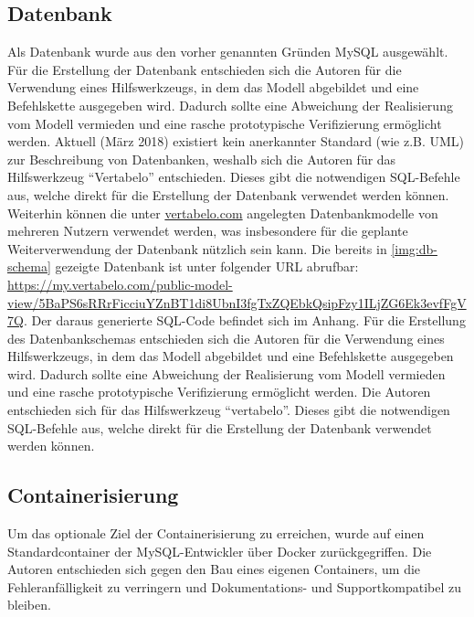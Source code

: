 \subsection{Datenbank}


Als Datenbank wurde aus den vorher genannten Gründen MySQL ausgewählt.
Für die Erstellung der Datenbank entschieden sich die Autoren für die Verwendung eines Hilfswerkzeugs, in dem das Modell abgebildet und eine Befehlskette ausgegeben wird. Dadurch sollte eine Abweichung der Realisierung vom Modell vermieden und eine rasche prototypische Verifizierung ermöglicht werden. Aktuell (März 2018) existiert kein anerkannter Standard (wie z.B. UML) zur Beschreibung von Datenbanken, weshalb sich die Autoren für das Hilfswerkzeug \enquote{Vertabelo} entschieden. Dieses gibt die notwendigen SQL-Befehle aus, welche direkt für die Erstellung der Datenbank verwendet werden können. Weiterhin können die unter \url{vertabelo.com} angelegten Datenbankmodelle von mehreren Nutzern verwendet werden, was insbesondere für die geplante Weiterverwendung der Datenbank nützlich sein kann.
Die bereits in \autoref{img:db-schema} gezeigte Datenbank ist unter folgender URL abrufbar: \url{https://my.vertabelo.com/public-model-view/5BaPS6sRRrFicciuYZnBT1di8UbnI3fgTxZQEbkQsipFzy1ILjZG6Ek3evfFgV7Q}. Der daraus generierte SQL-Code befindet sich im Anhang.
Für die Erstellung des Datenbankschemas entschieden sich die Autoren für die Verwendung eines Hilfswerkzeugs, in dem das Modell abgebildet und eine Befehlskette ausgegeben wird. Dadurch sollte eine Abweichung der Realisierung vom Modell vermieden und eine rasche prototypische Verifizierung ermöglicht werden. Die Autoren entschieden sich für das Hilfswerkzeug \enquote{vertabelo}. Dieses gibt die notwendigen SQL-Befehle aus, welche direkt für die Erstellung der Datenbank verwendet werden können.





\subsection{Containerisierung}

Um das optionale Ziel der Containerisierung zu erreichen, wurde auf einen Standardcontainer der MySQL-Entwickler über Docker zurückgegriffen. Die Autoren entschieden sich gegen den Bau eines eigenen Containers, um die Fehleranfälligkeit zu verringern und Dokumentations- und Supportkompatibel zu bleiben.



